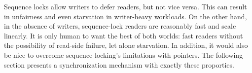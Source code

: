 Sequence locks allow writers to defer readers, but not vice versa.
This can result in unfairness and even starvation
in writer-heavy workloads.
On the other hand, in the absence of writers, sequence-lock readers are
reasonably fast and scale linearly.
It is only human to want the best of both worlds: fast readers without
the possibility of read-side failure, let alone starvation.
In addition, it would also be nice to overcome sequence locking's limitations
with pointers.
The following section presents a synchronization mechanism with exactly
these proporties.
